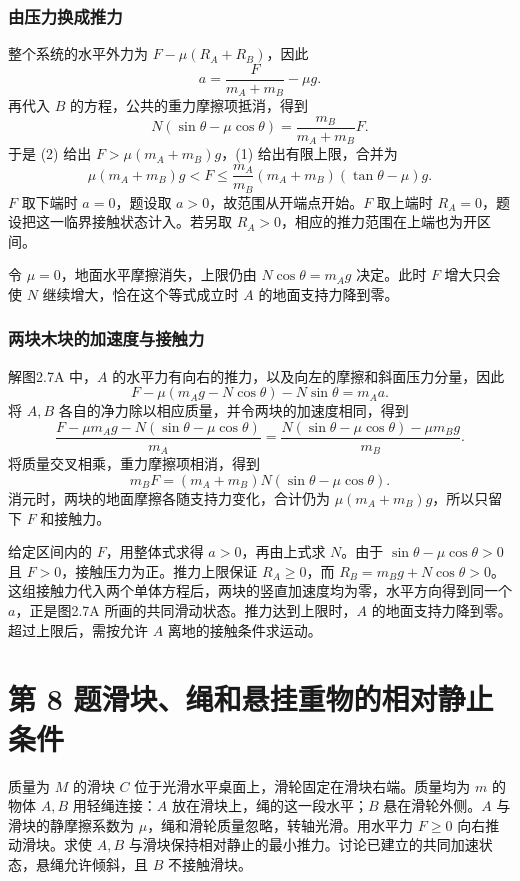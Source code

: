 \documentclass[UTF8,fontset=fandol,a4paper,11pt]{ctexart}
\newcommand{\tagline}[1]{\noindent{\small\color{muted}#1}\par}
\begin{document}
\subsubsection*{由压力换成推力}
整个系统的水平外力为 $F-\mu(R_A+R_B)$，因此
\[
a=\frac{F}{m_A+m_B}-\mu g.
\]
再代入 $B$ 的方程，公共的重力摩擦项抵消，得到
\[
N(\sin\theta-\mu\cos\theta)
=\frac{m_B}{m_A+m_B}F.
\]
于是 (2) 给出 $F>\mu(m_A+m_B)g$，(1) 给出有限上限，合并为
\[
\boxed{\mu(m_A+m_B)g<F
\leq\frac{m_A}{m_B}(m_A+m_B)(\tan\theta-\mu)g}.
\]
$F$ 取下端时 $a=0$，题设取 $a>0$，故范围从开端点开始。$F$ 取上端时 $R_A=0$，题设把这一临界接触状态计入。若另取 $R_A>0$，相应的推力范围在上端也为开区间。

令 $\mu=0$，地面水平摩擦消失，上限仍由 $N\cos\theta=m_Ag$ 决定。此时 $F$ 增大只会使 $N$ 继续增大，恰在这个等式成立时 $A$ 的地面支持力降到零。
\subsubsection*{两块木块的加速度与接触力}
解图2.7A 中，$A$ 的水平力有向右的推力，以及向左的摩擦和斜面压力分量，因此
\[
F-\mu(m_Ag-N\cos\theta)-N\sin\theta=m_Aa.
\]
将 $A,B$ 各自的净力除以相应质量，并令两块的加速度相同，得到
\[
\frac{F-\mu m_Ag-N(\sin\theta-\mu\cos\theta)}{m_A}
=\frac{N(\sin\theta-\mu\cos\theta)-\mu m_Bg}{m_B}.
\]
将质量交叉相乘，重力摩擦项相消，得到
\[
m_BF=(m_A+m_B)N(\sin\theta-\mu\cos\theta).
\]
消元时，两块的地面摩擦各随支持力变化，合计仍为 $\mu(m_A+m_B)g$，所以只留下 $F$ 和接触力。

给定区间内的 $F$，用整体式求得 $a>0$，再由上式求 $N$。由于 $\sin\theta-\mu\cos\theta>0$ 且 $F>0$，接触压力为正。推力上限保证 $R_A\geq0$，而 $R_B=m_Bg+N\cos\theta>0$。这组接触力代入两个单体方程后，两块的竖直加速度均为零，水平方向得到同一个 $a$，正是图2.7A 所画的共同滑动状态。推力达到上限时，$A$ 的地面支持力降到零。超过上限后，需按允许 $A$ 离地的接触条件求运动。




\section*{第 8 题\quad 滑块、绳和悬挂重物的相对静止条件}

\tagline{M-02-08}

质量为 $M$ 的滑块 $C$ 位于光滑水平桌面上，滑轮固定在滑块右端。质量均为 $m$ 的物体 $A,B$ 用轻绳连接：$A$ 放在滑块上，绳的这一段水平；$B$ 悬在滑轮外侧。$A$ 与滑块的静摩擦系数为 $\mu$，绳和滑轮质量忽略，转轴光滑。用水平力 $F\geq0$ 向右推动滑块。求使 $A,B$ 与滑块保持相对静止的最小推力。讨论已建立的共同加速状态，悬绳允许倾斜，且 $B$ 不接触滑块。
\end{document}
